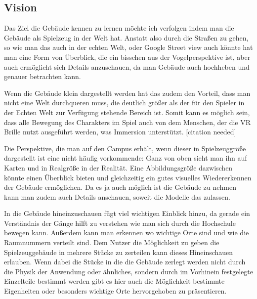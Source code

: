 \documentclass[11pt]{article} %
\begin{document}
\subsection{Vision}

Das Ziel die Gebäude kennen zu lernen möchte ich verfolgen indem man die Gebäude als Spielzeug in der Welt hat. Anstatt also durch die Straßen zu gehen, so wie man das auch in der echten Welt, oder Google Street view auch könnte hat man eine Form von Überblick, die ein bisschen aus der Vogelperspektive ist, aber auch ermöglicht sich Details anzuschauen, da man Gebäude auch hochheben und genauer betrachten kann.

Wenn die Gebäude klein dargestellt werden hat das zudem den Vorteil, dass man nicht eine Welt durchqueren muss, die deutlich größer als der für den Spieler in der Echten Welt zur Verfügung stehende Bereich ist. Somit kann es möglich sein, dass alle Bewegung des Charakters im Spiel auch von dem Menschen, der die VR Brille nutzt ausgeführt werden, was Immersion unterstützt. [citation needed]

Die Perspektive, die man auf den Campus erhält, wenn dieser in Spielzeuggröße dargestellt ist eine nicht häufig vorkommende: Ganz von oben sieht man ihn auf Karten und in Realgröße in der Realität. Eine Abbildungsgröße dazwischen könnte einen Überblick bieten und gleichzeitig ein gutes visuelles Wiedererkennen der Gebäude ermöglichen. Da es ja auch möglich ist die Gebäude zu nehmen kann man zudem auch Details anschauen, soweit die Modelle das zulassen.


In die Gebäude hineinzuschauen fügt viel wichtigen Einblick hinzu, da gerade ein Verständnis der Gänge hilft zu verstehen wie man sich durch die Hochschule bewegen kann. Außerdem kann man erkennen wo wichtige Orte sind und wie die Raumnummern verteilt sind. 
Dem Nutzer die Möglichkeit zu geben die Spielzeuggebäude in mehrere Stücke zu zerteilen kann dieses Hineinschauen erlauben. Wenn dabei die Stücke in die die Gebäude zerlegt werden nicht durch die Physik der Anwendung oder ähnliches, sondern durch im Vorhinein festgelegte Einzelteile bestimmt werden gibt es hier auch die Möglichkeit bestimmte Eigenheiten oder besonders wichtige Orte hervorgehoben zu präsentieren.
\end{document}

